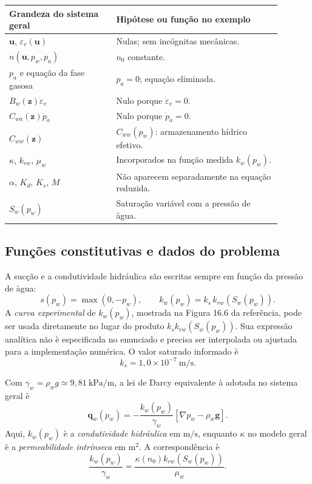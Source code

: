 \documentclass[11pt,a4paper]{article}
\numberwithin{equation}{section}
\begin{document}
\begin{center}
\begin{tabular}{p{0.35\linewidth}p{0.54\linewidth}}
\toprule
Grandeza do sistema geral & Hip\'otese ou fun\c{c}\~ao no exemplo \\
\midrule
$\mathbf u$, $\varepsilon_v(\mathbf u)$ & Nulas; sem inc\'ognitas mec\^anicas.\\
$n(\mathbf u,p_w,p_a)$ & $n_0$ constante.\\
$p_a$ e equa\c{c}\~ao da fase gasosa & $p_a=0$; equa\c{c}\~ao eliminada.\\
$B_w(\mathbf z)\dot\varepsilon_v$ & Nulo porque $\dot\varepsilon_v=0$.\\
$C_{wa}(\mathbf z)\dot p_a$ & Nulo porque $\dot p_a=0$.\\
$C_{ww}(\mathbf z)$ & $C_{ww}(p_w)$: armazenamento h\'idrico efetivo.\\
$\kappa$, $k_{rw}$, $\mu_w$ & Incorporados na fun\c{c}\~ao medida $k_w(p_w)$.\\
$\alpha$, $K_d$, $K_s$, $M$ & N\~ao aparecem separadamente na equa\c{c}\~ao reduzida.\\
$S_w(p_w)$ & Satura\c{c}\~ao vari\'avel com a press\~ao de \`agua.\\
\bottomrule
\end{tabular}
\end{center}

\subsection{Fun\c{c}\~oes constitutivas e dados do problema}

A suc\c{c}\~ao e a condutividade hidr\'aulica s\~ao escritas sempre
em fun\c{c}\~ao da press\~ao de \`agua:
\begin{equation}
\boxed{s(p_w)=\max(0,-p_w),\qquad
k_w(p_w)=k_s\,k_{rw}(S_w(p_w)).}
\end{equation}
A \emph{curva experimental} de $k_w(p_w)$, mostrada na
Figura 16.6 da refer\^encia, pode ser usada diretamente no lugar
do produto $k_s k_{rw}(S_w(p_w))$. Sua express\~ao anal\'itica
n\~ao \`e especificada no enunciado e precisa ser interpolada ou ajustada
para a implementa\c{c}\~ao num\'erica. O valor saturado informado \`e
\begin{equation}
\boxed{k_s=1{,}0\times10^{-7}\ \mathrm{m/s}.}
\end{equation}

Com $\gamma_w=\rho_w g\simeq9{,}81\ \mathrm{kPa/m}$,
a lei de Darcy equivalente \`a adotada no sistema geral \`e
\begin{equation}
\boxed{\mathbf q_w(p_w)=
-\frac{k_w(p_w)}{\gamma_w}
\left[\nabla p_w-\rho_w\mathbf g\right].}
\end{equation}
Aqui, $k_w(p_w)$ \`e a \emph{condutividade hidr\'aulica} em
$\mathrm{m/s}$, enquanto $\kappa$ no modelo geral \`e a
\emph{permeabilidade intr\'inseca} em $\mathrm{m^2}$. A correspond\^encia \`e
\begin{equation}
\boxed{\frac{k_w(p_w)}{\gamma_w}
=\frac{\kappa(n_0)k_{rw}(S_w(p_w))}{\mu_w}.}
\end{equation}
\end{document}

